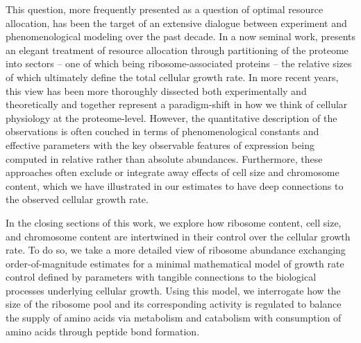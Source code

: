 
This question, more frequently presented as a question of optimal resource
allocation, has been the target of an extensive dialogue between experiment
and phenomenological modeling over the past decade. In a now seminal work,
\cite{scott2010} presents an elegant treatment of resource allocation through
partitioning of the proteome into sectors -- one of which being
ribosome-associated proteins -- the relative sizes of which ultimately define the total cellular growth rate. In
more recent years, this view has been more thoroughly
dissected both experimentally and theoretically
\citep{klumpp2014,basan2015,dai2018, dai2016, erickson2017} and together represent a paradigm-shift in how we think of cellular physiology at the
proteome-level. However, the quantitative description of the observations is often
couched in terms of phenomenological constants and effective parameters with the
key observable features of expression being computed in relative rather than
absolute abundances. Furthermore, these approaches often exclude or integrate
away effects of cell size and chromosome content, which we have illustrated in
our estimates to have deep connections to the observed cellular growth rate.  

In the closing sections of this work, we explore how ribosome content, cell
size, and chromosome content are intertwined in their control over the cellular
growth rate. To do so, we take a more detailed view of ribosome abundance
exchanging order-of-magnitude estimates for a minimal mathematical  
model of growth rate control defined by parameters with
tangible connections to the biological processes underlying cellular growth.
Using this model, we interrogate how the size of the ribosome pool and its
corresponding activity is regulated to balance the supply of amino acids via metabolism and catabolism
with consumption of amino acids through peptide bond formation. 

